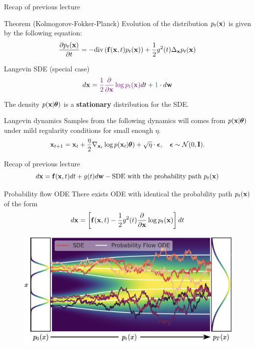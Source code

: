 \begin{frame}{Recap of previous lecture}
 	\begin{block}{Theorem (Kolmogorov-Fokker-Planck)}
 		Evolution of the distribution $p_t(\mathbf{x})$ is given by the following equation:
 		\vspace{-0.3cm}
 		\[
 			\frac{\partial p_t(\mathbf{x})}{\partial t} = - \text{div}\left(\mathbf{f}(\mathbf{x}, t) p_t(\mathbf{x})\right) + \frac{1}{2}g^2(t) \Delta_{\mathbf{x}}p_t(\mathbf{x})
 		\]
 		\vspace{-0.5cm}
 	\end{block}
 	\begin{block}{Langevin SDE (special case)}
 		\vspace{-0.3cm}
 		\[
 			d \mathbf{x} = {\color{violet}\frac{1}{2} \frac{\partial}{\partial \mathbf{x}} \log p_t(\mathbf{x})} d t + {\color{teal} 1 } \cdot d \mathbf{w}
 		\]
 		\vspace{-0.3cm}
 	\end{block}
 	The density $p(\mathbf{x} | \boldsymbol{\theta})$ is a \textbf{stationary} distribution for the SDE.
	\begin{block}{Langevin dynamics}
		Samples from the following dynamics will comes from $p(\mathbf{x} | \boldsymbol{\theta})$ under mild regularity conditions for small enough $\eta$.
		\vspace{-0.2cm}
		\[
			\mathbf{x}_{t + 1} = \mathbf{x}_t + \frac{\eta}{2} \nabla_{\mathbf{x}_t} \log p(\mathbf{x}_t | \boldsymbol{\theta}) + \sqrt{\eta} \cdot \boldsymbol{\epsilon}, \quad \boldsymbol{\epsilon} \sim \mathcal{N}(0, \mathbf{I}).
		\]
	\end{block}
\end{frame}
\begin{frame}{Recap of previous lecture}
	\vspace{-0.5cm}
	\[
		d\mathbf{x} = \mathbf{f}(\mathbf{x}, t) dt + g(t) d \mathbf{w} - \text{SDE with the probability path } p_t(\mathbf{x})
	\]
	\vspace{-0.5cm}
	\begin{block}{Probability flow ODE}
		There exists ODE with identical the probability path $p_t(\mathbf{x})$ of the form
		\vspace{-0.3cm}
		\[
			d\mathbf{x} = \left[\mathbf{f}(\mathbf{x}, t) -\frac{1}{2} g^2(t) \frac{\partial}{\partial \mathbf{x}} \log p_t(\mathbf{x}) \right] dt
		\]
		\vspace{-0.3cm}
	\end{block}
	\begin{figure}
		\includegraphics[width=0.75\linewidth]{figs/probability_flow}
	\end{figure}
\end{frame}

